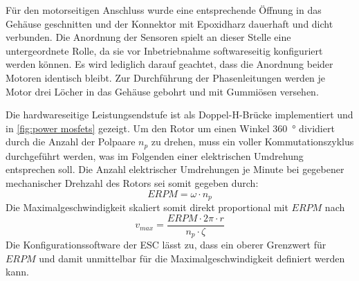 	Für den motorseitigen Anschluss wurde eine entsprechende Öffnung in das Gehäuse geschnitten und der Konnektor mit Epoxidharz dauerhaft und dicht verbunden.
	Die Anordnung der Sensoren spielt an dieser Stelle eine untergeordnete Rolle, da sie vor Inbetriebnahme softwareseitig konfiguriert werden können.
	Es wird lediglich darauf geachtet, dass die Anordnung beider Motoren identisch bleibt.
	Zur Durchführung der Phasenleitungen werden je Motor drei Löcher in das Gehäuse gebohrt und mit Gummiösen versehen.\par\medskip
	Die hardwareseitige Leistungsendstufe ist als Doppel-H-Brücke implementiert und in \cref{fig:power mosfets} gezeigt.
	Um den Rotor um einen Winkel \qty{360}{\degree} dividiert durch die Anzahl der Polpaare \(n_p\) zu drehen, muss ein voller Kommutationszyklus durchgeführt werden, was im Folgenden einer elektrischen Umdrehung entsprechen soll.
	Die Anzahl elektrischer Umdrehungen je Minute bei gegebener mechanischer Drehzahl des Rotors sei somit gegeben durch:
	\begin{equation}
		ERPM = \omega \cdot n_p
		\label{eq:ERPM and RPM}
	\end{equation}
	Die Maximalgeschwindigkeit skaliert somit direkt proportional mit \(ERPM\) nach
	\begin{equation}
		v_{max} = \frac{ERPM \cdot 2\pi \cdot r}{n_p \cdot \zeta}
		\label{eq:max speed by ERPM}
	\end{equation}
	Die Konfigurationssoftware der ESC lässt zu, dass ein oberer Grenzwert für \(ERPM\) und damit unmittelbar für die Maximalgeschwindigkeit definiert werden kann.


